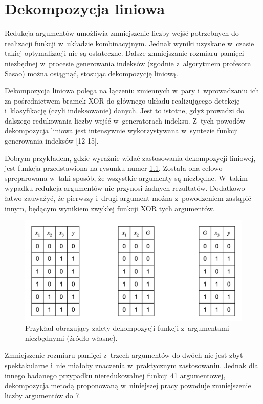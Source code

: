 \chapter{Dekompozycja liniowa}
\label{chapter:decomposition}

Redukcja argumentów umożliwia zmniejszenie liczby wejść potrzebnych do realizacji funkcji w~układzie kombinacyjnym.
Jednak wyniki uzyskane w~czasie takiej optymalizacji nie są ostateczne.
Dalsze zmniejszanie rozmiaru pamięci niezbędnej w~procesie generowania indeksów (zgodnie z~algorytmem profesora Sasao) można osiągnąć,
stosując dekompozycję liniową.

Dekompozycja liniowa polega na  łączeniu zmiennych w~pary i~wprowadzaniu ich za pośrednictwem bramek XOR do głównego układu realizującego detekcję i~klasyfikację (czyli indeksowanie) danych.
Jest to istotne,
gdyż prowadzi do dalszego redukowania liczby wejść w~generatorach indeksu.
Z~tych powodów dekompozycja liniowa jest intensywnie wykorzystywana w~syntezie funkcji generowania indeksów [12-15].

Dobrym przykładem,
gdzie wyraźnie widać zastosowania dekompozycji liniowej,
jest funkcja przedstawiona na rysunku numer \ref{fig:required-decomposition}.
Została ona celowo spreparowana w~taki sposób,
że wszystkie argumenty są niezbędne.
W~takim wypadku redukcja argumentów nie przynosi żadnych rezultatów.
Dodatkowo łatwo zauważyć,
że pierwszy i~drugi argument można z~powodzeniem zastąpić innym,
będącym wynikiem zwykłej funkcji XOR tych argumentów.

\begin{figure}
\centering
\includegraphics[width = 13cm]{chapter03/required-decomposition.png}
\caption{Przykład obrazujący zalety dekompozycji funkcji z~argumentami niezbędnymi (źródło własne).}
\label{fig:required-decomposition}
\end{figure}

Zmniejszenie rozmiaru pamięci z~trzech argumentów do dwóch nie jest zbyt spektakularne i~nie miałoby znaczenia w~praktycznym zastosowaniu.
Jednak dla innego badanego przypadku nieredukowalnej funkcji 41 argumentowej,
dekompozycja metodą proponowaną w~niniejszej pracy powoduje zmniejszenie liczby argumentów do 7.

